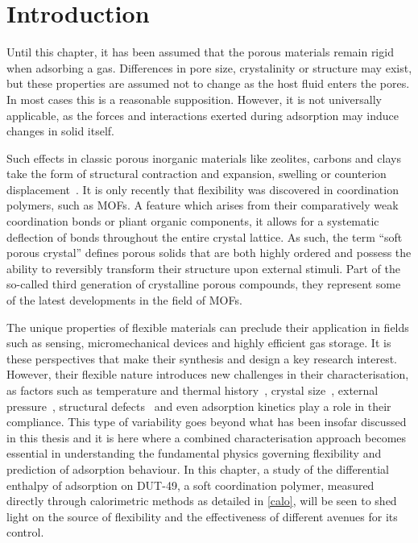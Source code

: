 
\section{Introduction}

Until this chapter, it has been assumed that the porous materials 
remain rigid when adsorbing a gas. Differences in pore size, crystalinity 
or structure may exist, but these properties are assumed not to change
as the host fluid enters the pores.
In most cases this is a reasonable supposition. However, it is not 
universally applicable, as the forces and interactions exerted 
during adsorption may induce changes in solid itself.

Such effects in classic porous inorganic materials like zeolites, carbons 
and clays take the form of structural contraction and expansion, swelling
or counterion displacement~\cite{coudertMolecularInsightCO2017}.
It is only recently that flexibility was discovered in coordination
polymers, such as \glspl{MOF}. A feature which arises from 
their comparatively weak coordination bonds or pliant organic components,
it allows for a systematic deflection of bonds throughout the 
entire crystal lattice.
As such, the term ``soft porous crystal'' defines porous solids that are 
both highly ordered and possess the ability to reversibly transform
their structure upon external stimuli. Part of the so-called
third generation of crystalline porous compounds, they represent 
some of the latest developments in the field of \glspl{MOF}.

The unique properties of flexible materials can preclude
their application in fields such as sensing, micromechanical
devices and highly efficient gas storage. It is these perspectives
that make their synthesis and design a key research interest.
However, their flexible nature introduces new challenges in
their characterisation, as factors such as temperature and
thermal history~\cite{liuReversibleStructuralTransition2008},
crystal size~\cite{zhangCrystalSizeDependentStructuralTransitions2014, %
krauseEffectCrystalliteSize2018}, external 
pressure~\cite{itoReversiblePoreSize2013, %
chanutUsingExternalFactors2016}, structural defects~\cite{bennettInterplayDefectsDisorder2016} 
and even adsorption kinetics play a role in their compliance.
This type of variability goes beyond what has been insofar discussed
in this thesis and it is here where a combined characterisation approach
becomes essential in understanding the fundamental physics
governing flexibility and prediction of adsorption behaviour.
In this chapter, a study of the differential enthalpy of adsorption
on DUT-49, a soft coordination polymer,
measured directly through calorimetric methods as detailed in 
\autoref{calo}, will be seen to shed light on the source of 
flexibility and the effectiveness of different avenues for its
control.

